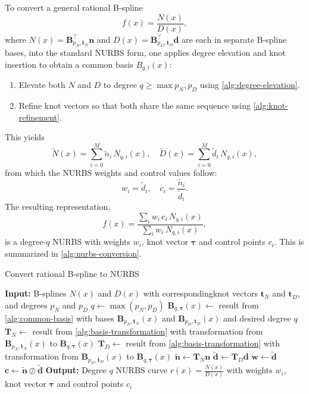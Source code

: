 To convert a general rational B-spline
$$
    f(x) = \frac{N(x)}{D(x)},
$$
where $N(x)=\mathbf B_{p_N,\mathbf t_N}^\top\mathbf n$ and $D(x)=\mathbf B_{p_D,\mathbf t_D}^\top\mathbf d$ are each in separate B-spline bases, into the standard NURBS form, one applies degree elevation and knot insertion \citep{Piegl1997} to obtain a common basis ${B_{q,i}(x)}$:
\begin{enumerate}
    \item Elevate both $N$ and $D$ to degree $q\ge\max{p_N,p_D}$ using \cref{alg:degree-elevation}.
    \item Refine knot vectors so that both share the same sequence using \cref{alg:knot-refinement}.
\end{enumerate}
This yields
$$
    \widetilde N(x) = \sum_{i=0}^M \tilde n_i\,N_{q,i}(x),\quad \widetilde D(x) = \sum_{i=0}^M \tilde d_i\,N_{q,i}(x),
$$
from which the NURBS weights and control values follow:
$$
    w_i = \tilde d_i, \quad
    c_i = \frac{\tilde n_i}{\tilde d_i}.
$$
The resulting representation,
$$
    f(x) = \frac{\sum_i w_i\,c_i\,N_{q,i}(x)}{\sum_i w_i\,N_{q,i}(x)},
$$
is a degree-$q$ NURBS with weights $w_i$, knot vector $\boldsymbol{\tau}$ and control points $c_i$. This is summarized in \cref{alg:nurbs-conversion}.

\begin{algorithm}
    \caption{Convert rational B-spline to NURBS}\label{alg:nurbs-conversion}
    \begin{algorithmic}[1]
        \State \textbf{Input:} B-splines $N(x)$ and $D(x)$ with correspondingknot vectors $\mathbf t_N$ and $\mathbf t_D$, and degrees $p_N$ and $p_D$
        \State $q \gets \max(p_N, p_D)$
        \State $\mathbf B_{q,\boldsymbol{\tau}}(x) \gets $ result from \cref{alg:common-basis} with bases $\mathbf B_{p_N,\mathbf t_N}(x)$ and $\mathbf B_{p_D,\mathbf t_D}(x)$ and desired degree $q$
        \State $\mathbf T_N \gets $ result from \cref{alg:basis-transformation} with transformation from $\mathbf B_{p_N,\mathbf t_N}(x)$ to $\mathbf B_{q,\boldsymbol{\tau}}(x)$
        \State $\mathbf T_D \gets $ result from \cref{alg:basis-transformation} with transformation from $\mathbf B_{p_D,\mathbf t_D}(x)$ to $\mathbf B_{q,\boldsymbol{\tau}}(x)$
        \State $\mathbf{\tilde n} \gets \mathbf T_N \mathbf n$
        \State $\mathbf{\tilde d} \gets \mathbf T_D \mathbf d$
        \State $\mathbf w \gets \mathbf{\tilde d}$
        \State $\mathbf c \gets \mathbf{\tilde n} \oslash \mathbf{\tilde d}$ 
        \State \textbf{Output:} Degree $q$ NURBS curve $\displaystyle r(x) = \frac{N(x)}{D(x)}$ with weights $w_i$, knot vector $\boldsymbol{\tau}$ and control points $c_i$
    \end{algorithmic}
\end{algorithm}


